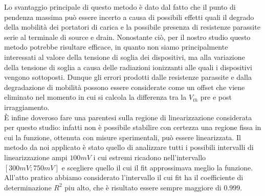 Lo svantaggio principale di questo metodo è dato dal fatto che il punto di pendenza massima può essere incerto a causa di possibili effetti quali il degrado della mobilità dei portatori di carica e la possibile presenza di resistenze parassite serie al terminale di source e drain.
Nonostante ciò, per il nostro studio questo metodo potrebbe risultare efficace, in quanto non siamo principalmente interessati al valore della tensione di soglia dei dispositivi, ma alla variazione della tensione di soglia a causa delle radiazioni ionizzanti alle quali i dispositivi vengono sottoposti. Dunque gli errori prodotti dalle resistenze parassite e dalla degradazione di mobilità possono essere considerate come un offset che viene eliminato nel momento in cui si calcola la differenza tra la $V_{th}$ pre e post irraggiamento.\\
È infine doveroso fare una parentesi sulla regione di linearizzazione considerata per questo studio: infatti non è possibile stabilire con certezza una regione fissa in cui la funzione, ottenuta con misure sperimentali, può essere linearizzata. Il metodo da noi applicato è stato quello di analizzare tutti i possibili intervalli di linearizzazione ampi $100 mV$ i cui estremi ricadono nell'intervallo $[300 mV ; 750mV]$ e scegliere quello il cui il fit approssimava meglio la funzione. All'atto pratico abbiamo considerato l'intervallo il cui fit ha il coefficiente di determinazione $R^2$ piu alto, che è risultato essere sempre maggiore di $0.999$.


